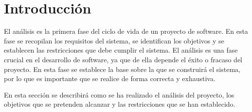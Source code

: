 \section{Introducción}
\label{sec:analisis_introduccion}

El análisis es la primera fase del ciclo de vida de un proyecto de software. En esta fase se recopilan los requisitos 
del sistema, se identifican los objetivos y se establecen las restricciones que debe cumplir el sistema. 
El análisis es una fase crucial en el desarrollo de software, ya que de ella depende el éxito o fracaso del proyecto. 
En esta fase se establece la base sobre la que se construirá el sistema, por lo que es importante que se realice de forma correcta y exhaustiva.

En esta sección se describirá como se ha realizado el análisis del proyecto, los objetivos que se pretenden alcanzar y las restricciones que se han establecido.

